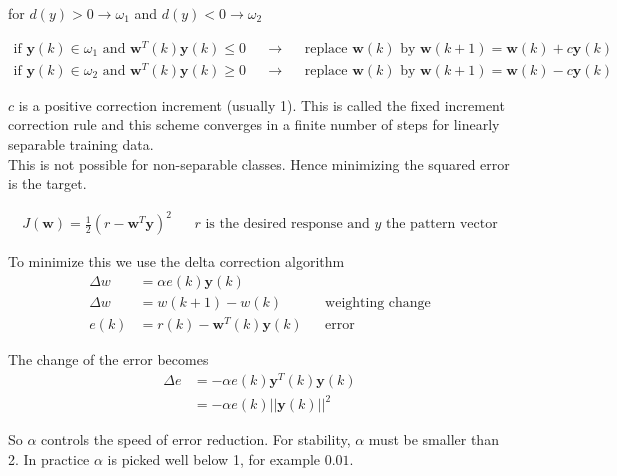 for $d(y)>0 \rightarrow \omega_1$ and $d(y)<0 \rightarrow \omega_2$

\begin{align*}
\text{if } \mathbf{y}(k) \in \omega_1 \text{ and } \mathbf{w}^T(k)\mathbf{y}(k) \leq 0 && \rightarrow && \text{replace } \mathbf{w}(k) \text{ by } \mathbf{w}(k+1) = \mathbf{w}(k) + c\mathbf{y}(k) \\
\text{if } \mathbf{y}(k) \in \omega_2 \text{ and } \mathbf{w}^T(k)\mathbf{y}(k) \geq 0 && \rightarrow && \text{replace } \mathbf{w}(k) \text{ by } \mathbf{w}(k+1) = \mathbf{w}(k)- c\mathbf{y}(k)
\end{align*}


$c$ is a positive correction increment (usually 1).
This is called the fixed increment correction rule and this scheme converges in a finite number of steps for linearly separable training data.\\

This is not possible for non-separable classes.
Hence minimizing the squared error is the target.

\begin{align*}
J(\mathbf{w}) = \frac{1}{2}(r-\mathbf{w}^T\mathbf{y})^2
&& r \text{ is the desired response and $y$ the pattern vector}
\end{align*}

To minimize this we use the delta correction algorithm
\begin{align*}
\Delta w &= \alpha e(k)\mathbf{y}(k) \\
\Delta w &= w(k+1)-w(k) && \text{weighting change} \\
e(k) &= r(k) - \mathbf{w}^T(k)\mathbf{y}(k) && \text{error}
\end{align*}

The change of the error becomes
\begin{align*}
\Delta e &= -\alpha e(k) \mathbf{y}^T(k) \mathbf{y}(k) \\
 &= - \alpha e(k) ||\mathbf{y}(k)||^2
\end{align*}

So $\alpha$ controls the speed of error reduction.
For stability, $\alpha$ must be smaller than 2.
In practice $\alpha$ is picked well below 1, for example $0.01$.


